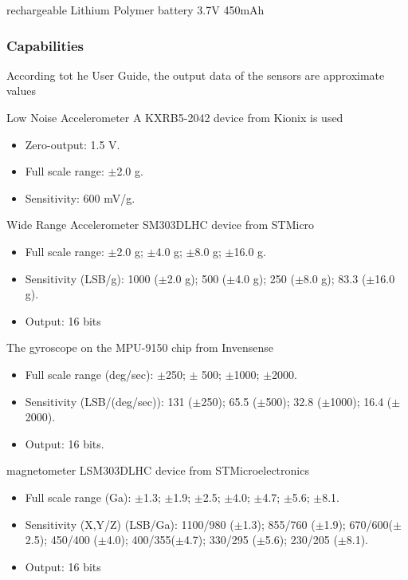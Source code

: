 rechargeable Lithium Polymer battery 3.7V 450mAh

\subsubsection*{Capabilities}
According tot he User Guide, the output data of the sensors are
approximate values

Low Noise Accelerometer
A KXRB5-2042 device
from Kionix is used

\begin{itemize}
  \item Zero-output: 1.5 V.
  \item Full scale range: $\pm$2.0 g.
  \item Sensitivity: 600 mV/g.
\end{itemize}

Wide Range Accelerometer
SM303DLHC
device from STMicro

\begin{itemize}
  \item Full scale range: $\pm$2.0 g; $\pm$4.0 g; $\pm$8.0 g; $\pm$16.0 g.
  \item Sensitivity (LSB/g): 1000 ($\pm$2.0 g); 500 ($\pm$4.0 g); 250 ($\pm$8.0 g);
83.3 ($\pm$16.0 g).
  \item Output: 16 bits
\end{itemize}


The gyroscope on the MPU-9150 chip from Invensense
\begin{itemize}
  \item Full scale range (deg/sec): $\pm$250; $\pm$ 500; $\pm$1000; $\pm$2000.
  \item Sensitivity (LSB/(deg/sec)): 131 ($\pm$250); 65.5 ($\pm$500); 32.8 ($\pm$1000); 16.4 ($\pm$2000).
  \item Output: 16 bits.
\end{itemize}


magnetometer
LSM303DLHC device from
STMicroelectronics
\begin{itemize}
  \item Full scale range (Ga): $\pm$1.3; $\pm$1.9; $\pm$2.5; $\pm$4.0; $\pm$4.7; $\pm$5.6; $\pm$8.1.
  \item Sensitivity (X,Y/Z) (LSB/Ga): 1100/980 ($\pm$1.3); 855/760 ($\pm$1.9); 670/600($\pm$2.5); 450/400 ($\pm$4.0); 400/355($\pm$4.7); 330/295 ($\pm$5.6); 230/205 ($\pm$8.1).
  \item Output: 16 bits
\end{itemize}



